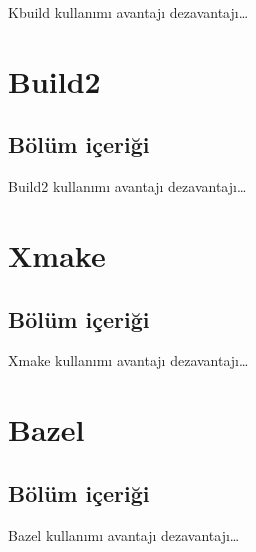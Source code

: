 \documentclass[
]{book}
\begin{document}
Kbuild kullanımı avantajı dezavantajı\ldots{}

\hypertarget{build2}{%
\chapter{Build2}\label{build2}}

\hypertarget{buxf6luxfcm-iuxe7eriux11fi-8}{%
\section{Bölüm içeriği}\label{buxf6luxfcm-iuxe7eriux11fi-8}}

Build2 kullanımı avantajı dezavantajı\ldots{}

\hypertarget{xmake}{%
\chapter{Xmake}\label{xmake}}

\hypertarget{buxf6luxfcm-iuxe7eriux11fi-9}{%
\section{Bölüm içeriği}\label{buxf6luxfcm-iuxe7eriux11fi-9}}

Xmake kullanımı avantajı dezavantajı\ldots{}

\hypertarget{bazel}{%
\chapter{Bazel}\label{bazel}}

\hypertarget{buxf6luxfcm-iuxe7eriux11fi-10}{%
\section{Bölüm içeriği}\label{buxf6luxfcm-iuxe7eriux11fi-10}}

Bazel kullanımı avantajı dezavantajı\ldots{}
\end{document}
